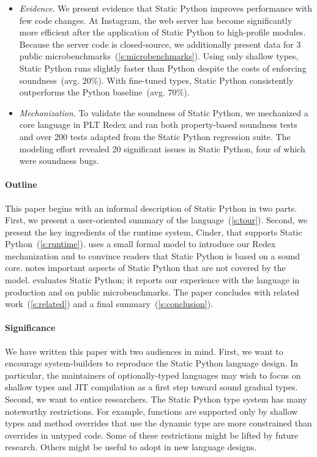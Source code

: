\documentclass[english,cleveref,submission]{programming}
\newcommand{\SP}{Static Python}
\newcommand{\pctnum}[1]{$#1\%$}
\newcommand{\numbenchmark}{3}
\begin{document}
\begin{itemize}
  \item
    \emph{Evidence}.
    We present evidence that \SP{} improves performance with few code changes.
    At Instagram, the web server has become significantly more efficient
    after the application of \SP{} to high-profile modules.
    Because the server code is closed-source, we additionally present data for
    \numbenchmark{} public microbenchmarks~(\cref{s:microbenchmarks}).
    Using only shallow types, \SP{} runs slightly faster than Python
    despite the costs of enforcing soundness~(avg. \pctnum{20}).
    With fine-tuned types, \SP{} consistently outperforms the Python
    baseline~(avg. \pctnum{70}).

  \item
    \emph{Mechanization}.
    To validate the soundness of \SP{}, we mechanized a core language in PLT Redex
    and ran both property-based soundness tests and over 200 tests adapted from the \SP{} regression suite.
    The modeling effort revealed 20 significant issues in \SP{},
    four of which were soundness bugs.

\end{itemize}

\paragraph*{Outline}

This paper begins with an informal description of \SP{} in two parts.
First, we present a user-oriented summary of the language~(\cref{s:tour}).
Second, we present the key ingredients of the runtime system, Cinder,
that supports \SP{}~(\cref{s:runtime}).
 uses a small formal model to introduce our Redex mechanization
and to convince readers that \SP{} is based on a sound core.
 notes important aspects of \SP{} that are not covered by the model.
 evaluates \SP{}; it reports our experience with the language in
production and on public microbenchmarks.
The paper concludes with related work~(\cref{s:related})
and a final summary~(\cref{s:conclusion}).


\paragraph*{Significance}

We have written this paper with two audiences in mind.
First, we want to encourage system-builders to reproduce the
\SP{} language design.
In particular, the maintainers of optionally-typed languages
may wish to focus on shallow types and JIT compilation as a
first step toward sound gradual types.
Second, we want to entice researchers.
The \SP{} type system has many noteworthy restrictions.
For example, functions are supported only by shallow types
and method overrides that use the dynamic type are more constrained
than overrides in untyped code.
Some of these restrictions might be lifted by future research.
Others might be useful to adopt in new language designs.
\end{document}
